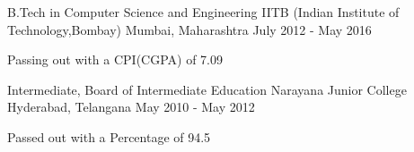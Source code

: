 \begin{cventries}
  \cventry
    {B.Tech in Computer Science and Engineering}
    {IITB (Indian Institute of Technology,Bombay)}
    {Mumbai, Maharashtra}
    {July 2012 - May 2016}
    {
      \begin{cvitems}
        \item{Passing out with a CPI(CGPA) of 7.09}
      \end{cvitems}
    }
  \cventry
    {Intermediate, Board of Intermediate Education}
    {Narayana Junior College}
    {Hyderabad, Telangana}
    {May 2010 - May 2012}
    {
      \begin{cvitems}
        \item{Passed out with a Percentage of 94.5}
      \end{cvitems}
    }
    
\end{cventries}
